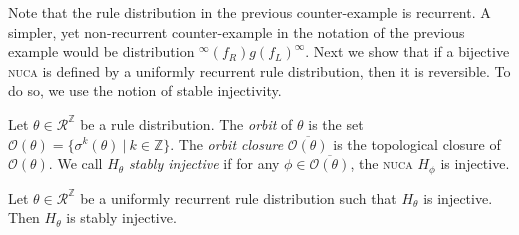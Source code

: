 \documentclass[runningheads]{llncs}
\newcommand{\Z}{\mathbb{Z}}
\newcommand{\R}{\mathcal{R}}
\newcommand{\set}[2]{\{ #1 \: | \: #2 \}}
\begin{document}
Note that the rule distribution in the previous counter-example is recurrent. A simpler, yet non-recurrent counter-example in the notation of the previous example would be distribution $^\infty (f_R)g(f_L)^\infty$. Next we show that if a bijective \textsc{nuca} is defined by a uniformly recurrent rule distribution, then it is reversible. To do so, we use the notion of stable injectivity. 

\begin{definition}
Let $\theta\in \R^\Z$ be a rule distribution. The \emph{orbit} of $\theta$ is the set $\mathcal{O}(\theta) = \set{\sigma^k (\theta)}{k\in \Z}$. The \emph{orbit closure} $\overline{\mathcal{O}(\theta)}$ is the topological closure of $\mathcal{O}(\theta)$. We call $H_\theta$ \emph{stably injective} if for any $\phi \in \overline{\mathcal{O}(\theta)}$, the \textsc{nuca} $H_\phi$ is injective. \cite{phung}
\end{definition}

\begin{lemma} \label{lemma_inj}
Let $\theta \in \R^\Z$ be a uniformly recurrent rule distribution such that $H_\theta$ is injective. Then $H_\theta$ is stably injective.
\end{lemma}
\end{document}
